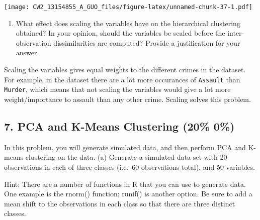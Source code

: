 \documentclass[]{article}
\providecommand{\tightlist}{%
  \setlength{\itemsep}{0pt}\setlength{\parskip}{0pt}}
\begin{document}
\texttt{[image: CW2\_13154855\_A\_GUO\_files/figure-latex/unnamed-chunk-37-1.pdf]}

\begin{enumerate}
\def\labelenumi{(\alph{enumi})}
\setcounter{enumi}{3}
\tightlist
\item
  What effect does scaling the variables have on the hierarchical
  clustering obtained? In your opinion, should the variables be scaled
  before the inter-observation dissimilarities are computed? Provide a
  justification for your answer.
\end{enumerate}

Scaling the variables gives equal weights to the different crimes in the
dataset. For example, in the dataset there are a lot more occurances of
\texttt{Assault} than \texttt{Murder}, which means that not scaling the
variables would give a lot more weight/importance to assault than any
other crime. Scaling solves this problem.

\subsection{7. PCA and K-Means Clustering (20\% \textbar{}
0\%)}\label{pca-and-k-means-clustering-20-0}

In this problem, you will generate simulated data, and then perform PCA
and K-means clustering on the data. (a) Generate a simulated data set
with 20 observations in each of three classes (i.e.~60 observations
total), and 50 variables.

Hint: There are a number of functions in R that you can use to generate
data. One example is the rnorm() function; runif() is another option. Be
sure to add a mean shift to the observations in each class so that there
are three distinct classes.
\end{document}
